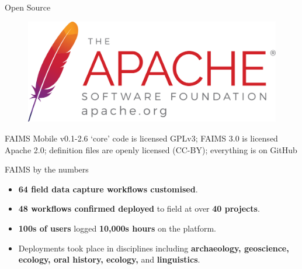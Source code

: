 \documentclass[
	aspectratio=169, %
	12pt, %
	t, %
]{beamer}
\begin{document}
\begin{refsegment}
\begin{frame}{Open Source}
 \begin{figure}[H]
    \centering
        \includegraphics[width=.65\textwidth]{figures/asf_logo_url.png}
        
        \label{fig:FAIMS-github-OSS}
 \end{figure}
 
FAIMS Mobile v0.1-2.6 `core' code is licensed GPLv3; FAIMS 3.0 is licensed Apache 2.0; definition files are openly licensed (CC-BY); everything is on GitHub 

\end{frame}


\begin{frame}{FAIMS by the numbers}
 \begin{itemize}
        \item \textbf{64 field data capture workflows customised}.
        \item \textbf{48 workflows confirmed deployed} to field at over \textbf{40 projects}.
        \item \textbf{100s of users} logged \textbf{10,000s hours} on the platform.
        \item Deployments took place in disciplines including \textbf{archaeology, geoscience, ecology, oral history, ecology, }and \textbf{linguistics}.
    \end{itemize}
\end{frame}



\end{refsegment}
\end{document}
